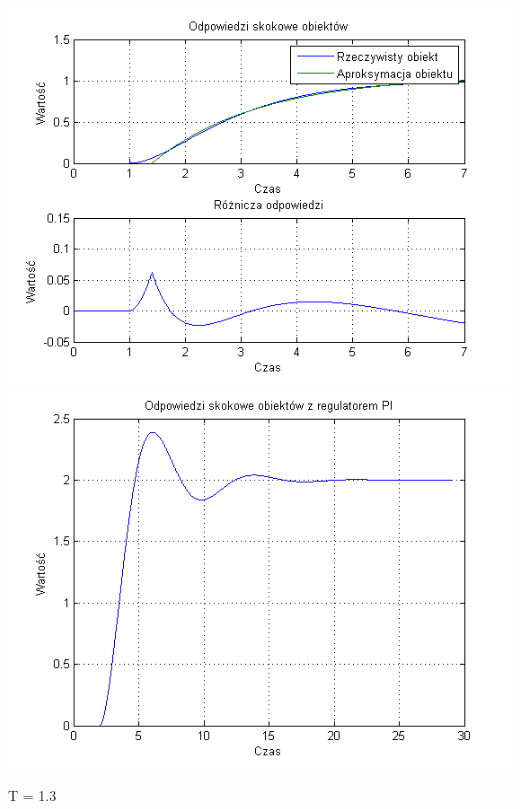 \documentclass[10pt,a4paper]{article}
\begin{document}
\begin{center}
\includegraphics[scale=1]{images/jeden/skrypt_59.png}\\
\includegraphics[scale=1]{images/jeden/skrypt_60.png}\\
\end{center}
\newpage
T = 1.3
\end{document}
